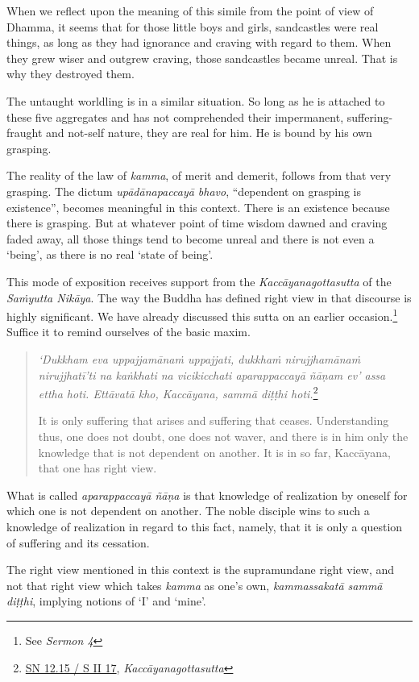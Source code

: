 When we reflect upon the meaning of this simile from the point of view of Dhamma, it seems that for those little boys and girls, sandcastles were real things, as long as they had ignorance and craving with regard to them. When they grew wiser and outgrew craving, those sandcastles became unreal. That is why they destroyed them.

The untaught worldling is in a similar situation. So long as he is attached to these five aggregates and has not comprehended their impermanent, suffering-fraught and not-self nature, they are real for him. He is bound by his own grasping.

The reality of the law of \emph{kamma}, of merit and demerit, follows from that very grasping. The dictum \emph{upādānapaccayā bhavo}, ``dependent on grasping is existence'', becomes meaningful in this context. There is an existence because there is grasping. But at whatever point of time wisdom dawned and craving faded away, all those things tend to become unreal and there is not even a `being', as there is no real `state of being'.

This mode of exposition receives support from the \emph{Kaccāyanagottasutta} of the \emph{Saṁyutta Nikāya}. The way the Buddha has defined right view in that discourse is highly significant. We have already discussed this sutta on an earlier occasion.\footnote{See \emph{Sermon 4}} Suffice it to remind ourselves of the basic maxim.

\begin{quote}
\emph{`Dukkham eva uppajjamānaṁ uppajjati, dukkhaṁ nirujjhamānaṁ nirujjhatī'ti na kaṅkhati na vicikicchati aparappaccayā ñāṇam ev' assa ettha hoti. Ettāvatā kho, Kaccāyana, sammā diṭṭhi hoti.}\footnote{\href{https://suttacentral.net/sn12.15/pli/ms}{SN 12.15 / S II 17}, \emph{Kaccāyanagottasutta}}

It is only suffering that arises and suffering that ceases. Understanding thus, one does not doubt, one does not waver, and there is in him only the knowledge that is not dependent on another. It is in so far, Kaccāyana, that one has right view.
\end{quote}

What is called \emph{aparappaccayā ñāṇa} is that knowledge of realization by oneself for which one is not dependent on another. The noble disciple wins to such a knowledge of realization in regard to this fact, namely, that it is only a question of suffering and its cessation.

The right view mentioned in this context is the supramundane right view, and not that right view which takes \emph{kamma} as one's own, \emph{kammassakatā sammā diṭṭhi}, implying notions of `I' and `mine'.

